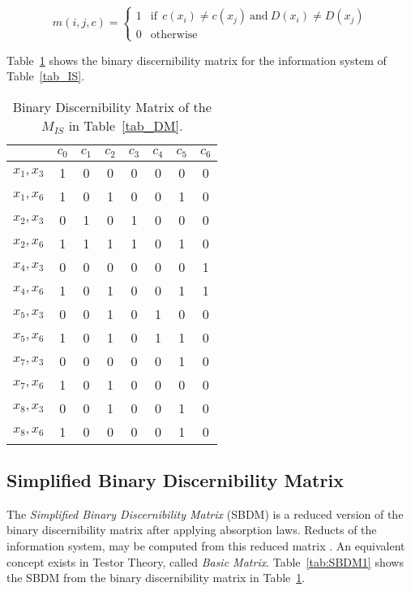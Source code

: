 \documentclass[authoryear,preprint,review,12pt]{elsarticle}
\begin{document}
  \begin{equation}
  	m(i, j, c)=\left\lbrace\begin{array}{cl}
  			1 & \mathrm{if~~}c(x_i) \neq c(x_j) \mathrm{~and~} D(x_i) \neq D(x_j)\\
  			0 								   & \mathrm{otherwise} 
  	\end{array}\right.
  \end{equation} 
  
  Table~\ref{tab_BDM} shows the binary discernibility matrix for the information system of Table~\ref{tab_IS}.  
  
  \begin{table}[htb]
		\caption{Binary Discernibility Matrix of the $M_{IS}$ in Table~\ref{tab_DM}.} \label{tab_BDM}
		\centering
 	\begin{tabular}{c|ccccccc}
 		& $c_0$ & $c_1$ & $c_2$ & $c_3$ & $c_4$ & $c_5$ & $c_6$\\
 		\hline
		$x_1,x_3$ & 1 & 0 & 0 & 0 & 0 & 0 & 0 \\
		$x_1,x_6$ & 1 & 0 & 1 & 0 & 0 & 1 & 0 \\
		$x_2,x_3$ & 0 & 1 & 0 & 1 & 0 & 0 & 0 \\
		$x_2,x_6$ & 1 & 1 & 1 & 1 & 0 & 1 & 0 \\
		$x_4,x_3$ & 0 & 0 & 0 & 0 & 0 & 0 & 1 \\
		$x_4,x_6$ & 1 & 0 & 1 & 0 & 0 & 1 & 1 \\
		$x_5,x_3$ & 0 & 0 & 1 & 0 & 1 & 0 & 0 \\
		$x_5,x_6$ & 1 & 0 & 1 & 0 & 1 & 1 & 0 \\
		$x_7,x_3$ & 0 & 0 & 0 & 0 & 0 & 1 & 0 \\
		$x_7,x_6$ & 1 & 0 & 1 & 0 & 0 & 0 & 0 \\
		$x_8,x_3$ & 0 & 0 & 1 & 0 & 0 & 1 & 0 \\
		$x_8,x_6$ & 1 & 0 & 0 & 0 & 0 & 1 & 0 
 	\end{tabular}             
  \end{table}

\subsection{Simplified Binary Discernibility Matrix}
  The \textit{Simplified Binary Discernibility Matrix} (SBDM) is a reduced version of the binary discernibility
  matrix after applying absorption laws. Reducts of the information system, may be computed from this reduced matrix \citep{Yao09}. An equivalent concept exists in Testor Theory, called \textit{Basic Matrix}. Table~\ref{tab:SBDM1} shows the SBDM from the binary discernibility matrix in Table~\ref{tab_BDM}.
  
\end{document}
